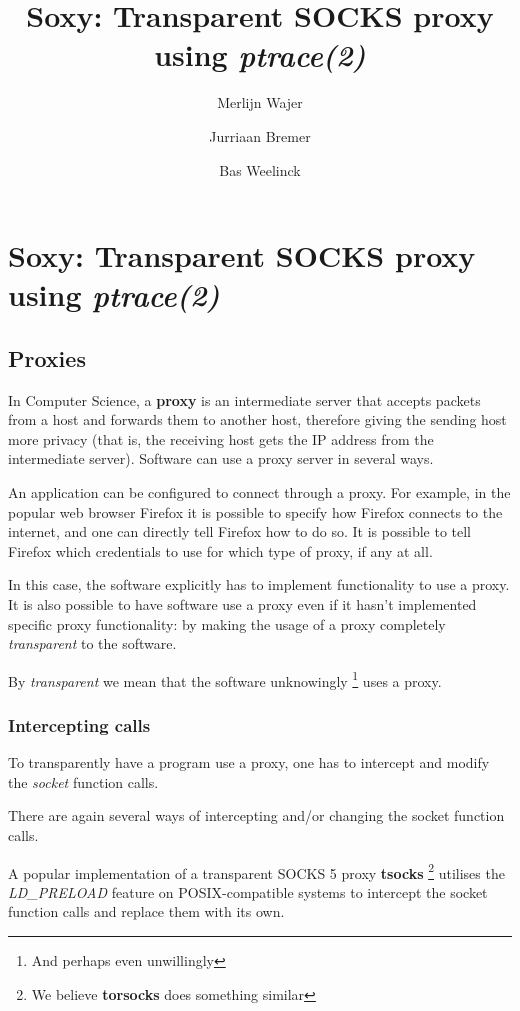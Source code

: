 \documentclass[a4paper]{article}
\author{Merlijn Wajer \and Jurriaan Bremer \and Bas Weelinck}
\title{Soxy: Transparent SOCKS proxy using \textit{ptrace(2)}}
\begin{document}
\maketitle

\section{Soxy: Transparent SOCKS proxy using \textit{ptrace(2)}}

\subsection{Proxies}
In Computer Science, a \textbf{proxy} is an intermediate server that
accepts packets from a host and forwards them to another host,
therefore giving the sending host more privacy (that is, the
receiving host gets the IP address from the intermediate server).
Software can use a proxy server in several ways.

An application can be configured to connect through a proxy. For example, in the popular web
browser Firefox it is possible to specify how Firefox connects to the internet,
and one can directly tell Firefox how to do so. It is possible to tell Firefox which credentials to use for which type of proxy, if any at all.

In this case, the software explicitly has to implement functionality to use a
proxy. It is also possible to have software use a proxy even if it hasn't
implemented specific proxy functionality: by making the usage of a proxy
completely \textit{transparent} to the software.

By \textit{transparent} we mean that the software unknowingly
\footnote{And perhaps even unwillingly} uses a proxy.

\subsubsection{Intercepting calls}

To transparently have a program use a proxy, one has to intercept and modify
the \textit{socket} function calls.

There are again several ways of intercepting and/or changing the socket function
calls.

A popular implementation of a transparent SOCKS 5 proxy \textbf{tsocks}
\footnote{We believe \textbf{torsocks} does something similar}
utilises the \textit{LD\_PRELOAD} feature on POSIX-compatible systems to
intercept the socket function calls and replace them with its own.
\end{document}
